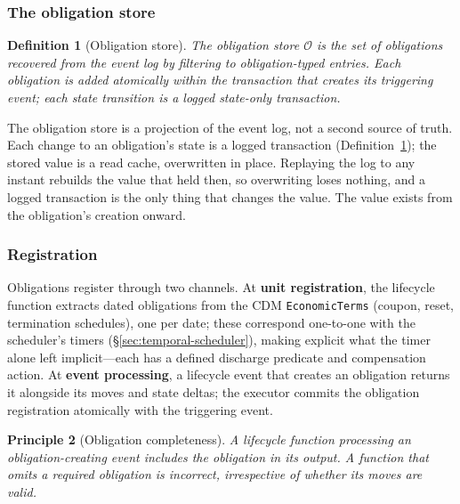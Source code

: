 \documentclass[11pt,a4paper]{article}
\newtheorem{definition}{Definition}[section]
\newtheorem{principle}[definition]{Principle}
\begin{document}
\subsubsection{The obligation store}
\label{sec:obligation-store}

\begin{definition}[Obligation store]
\label{def:obligation-store}
The \emph{obligation store} $\mathcal{O}$ is the set of obligations recovered from the event log by filtering to obligation-typed entries. Each obligation is added atomically within the transaction that creates its triggering event; each state transition is a logged state-only transaction.
\end{definition}

\noindent The obligation store is a projection of the event log, not a second source of truth. Each change to an obligation's state is a logged transaction (Definition~\ref{def:obligation-store}); the stored value is a read cache, overwritten in place. Replaying the log to any instant rebuilds the value that held then, so overwriting loses nothing, and a logged transaction is the only thing that changes the value. The value exists from the obligation's creation onward.

\subsubsection{Registration}
\label{sec:obligation-registration}

Obligations register through two channels. At \textbf{unit registration}, the lifecycle function extracts dated obligations from the CDM \texttt{EconomicTerms} (coupon, reset, termination schedules), one per date; these correspond one-to-one with the scheduler's timers (\S\ref{sec:temporal-scheduler}), making explicit what the timer alone left implicit---each has a defined discharge predicate and compensation action. At \textbf{event processing}, a lifecycle event that creates an obligation returns it alongside its moves and state deltas; the executor commits the obligation registration atomically with the triggering event.

\begin{principle}[Obligation completeness]
\label{princ:obligation-completeness}
A lifecycle function processing an obligation-creating event includes the obligation in its output. A function that omits a required obligation is incorrect, irrespective of whether its moves are valid.
\end{principle}
\end{document}
